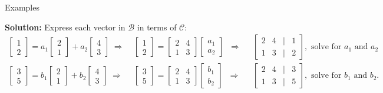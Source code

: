 \documentclass[10pt, aspectratio=169]{beamer}
\begin{document}
\begin{frame}{Examples}
{    \textbf{Solution:}  
    Express each vector in \( {\mathcal{B}} \) in terms of \( {\mathcal{C}} \):
    \begin{eqnarray*}
    \begin{bmatrix} 1 \\ 2 \end{bmatrix} = a_1 \begin{bmatrix} 2 \\ 1 \end{bmatrix} + a_2 \begin{bmatrix} 4 \\ 3 \end{bmatrix} \;\Rightarrow&\;
    \begin{bmatrix} 1 \\ 2 \end{bmatrix} = \begin{bmatrix} 2  & 4 \\ 1 & 3\end{bmatrix}
    \begin{bmatrix} a_1 \\ a_2 \end{bmatrix}\;\;\Rightarrow&\;\;
     \begin{bmatrix} 2 & 4 & | & 1\\ 1 & 3 & | & 2\end{bmatrix}, \text{ solve for } a_1 \text{ and } a_2\\
    \begin{bmatrix} 3 \\ 5 \end{bmatrix} = b_1 \begin{bmatrix} 2 \\ 1 \end{bmatrix} + b_2 \begin{bmatrix} 4 \\ 3 \end{bmatrix} \;\Rightarrow&\;
    \begin{bmatrix} 3 \\ 5 \end{bmatrix} = \begin{bmatrix} 2 & 4 \\ 1 & 3\end{bmatrix}
    \begin{bmatrix} b_1 \\ b_2 \end{bmatrix}\;\;\Rightarrow&\;\;
    \begin{bmatrix} 2 & 4 & | & 3\\ 1 & 3 & | & 5\end{bmatrix}, \text{ solve for } b_1 \text{ and } b_2.
    \end{eqnarray*}
    
}
\end{frame}
\end{document}
